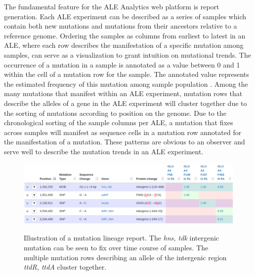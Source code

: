 \documentclass[12pt,final,masters,chapterheads]{ucsd}  %
\begin{document}
The fundamental feature for the ALE Analytics web platform is report generation. Each ALE experiment can be described as a series of samples which contain both new mutations and mutations from their ancestors relative to a reference genome. Ordering the samples as columns from earliest to latest in an ALE, where each row describes the manifestation of a specific mutation among samples, can serve as a visualization to grant intuition on mutational trends. The occurrence of a mutation in a sample is annotated as a value between 0 and 1 within the cell of a mutation row for the sample. The annotated value represents the estimated frequency of this mutation among sample population \cite{breseq_paper}. Among the many mutations that manifest within an ALE experiment, mutation rows that describe the alleles of a gene in the ALE experiment will cluster together due to the sorting of mutations according to position on the genome. Due to the chronological sorting of the sample columns per ALE, a mutation that fixes across samples will manifest as sequence cells in a mutation row annotated for the manifestation of a mutation. These patterns are obvious to an observer and serve well to describe the mutation trends in an ALE experiment.

\begin{figure}[h!]
  \caption{Illustration of a mutation lineage report. The \textit{hns, tdk} intergenic mutation can be seen to fix over time course of samples. The multiple mutation rows describing an allele of the intergenic region \textit{ttdR, ttdA} cluster together.}
  \centering
  \includegraphics[width=1\textwidth]{mutation_lineage_report.png}
  \label{fig:mutation_lineage_report}
\end{figure}
\end{document}

